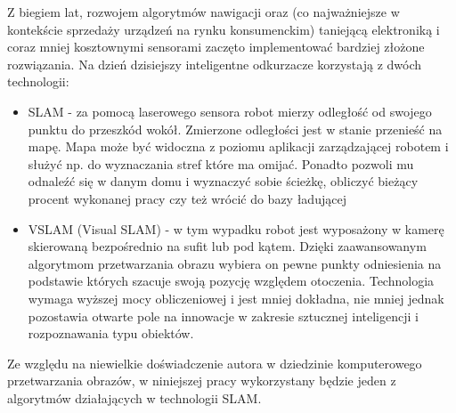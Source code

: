 Z biegiem lat, rozwojem algorytmów nawigacji oraz (co najważniejsze w kontekście sprzedaży urządzeń na rynku konsumenckim) taniejącą elektroniką i coraz mniej kosztownymi sensorami zaczęto implementować bardziej złożone rozwiązania. Na dzień dzisiejszy inteligentne odkurzacze korzystają z dwóch technologii:
\begin{itemize}
\item SLAM - za pomocą laserowego sensora robot mierzy odległość od swojego punktu do przeszkód wokół. Zmierzone odległości jest w stanie przenieść na mapę. Mapa może być widoczna z poziomu aplikacji zarządzającej robotem i służyć np. do wyznaczania stref które ma omijać. Ponadto pozwoli mu odnaleźć się w danym domu i wyznaczyć sobie ścieżkę, obliczyć bieżący procent wykonanej pracy czy też wrócić do bazy ładującej
\item VSLAM (Visual SLAM) - w tym wypadku robot jest wyposażony w kamerę skierowaną bezpośrednio na sufit lub pod kątem. Dzięki zaawansowanym algorytmom przetwarzania obrazu wybiera on pewne punkty odniesienia na podstawie których szacuje swoją pozycję względem otoczenia. Technologia wymaga wyższej mocy obliczeniowej i jest mniej dokładna, nie mniej jednak pozostawia otwarte pole na innowacje w zakresie sztucznej inteligencji i rozpoznawania typu obiektów.
\end{itemize}

Ze względu na niewielkie doświadczenie autora w dziedzinie komputerowego przetwarzania obrazów, w niniejszej pracy wykorzystany będzie jeden z algorytmów działających w technologii SLAM.

